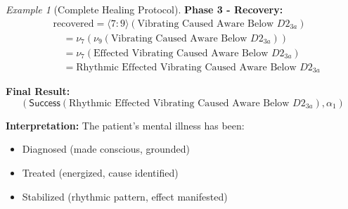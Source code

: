 \documentclass[11pt,twoside,openright]{book}
\theoremstyle{definition}
\theoremstyle{plain}
\theoremstyle{remark}
\newtheorem{example}[definition]{Example}
\newcommand{\noe}[1]{\nu_{#1}}
\begin{document}
\begin{example}[Complete Healing Protocol]
\textbf{Phase 3 - Recovery:}
\begin{align}
&\text{recovered} = \langle 7:9 \rangle(\text{Vibrating Caused Aware Below } D2_{3a}) \\
&\quad = \noe{7}(\noe{9}(\text{Vibrating Caused Aware Below } D2_{3a})) \\
&\quad = \noe{7}(\text{Effected Vibrating Caused Aware Below } D2_{3a}) \\
&\quad = \text{Rhythmic Effected Vibrating Caused Aware Below } D2_{3a}
\end{align}

\textbf{Final Result:}
\[
(\mathsf{Success}(\text{Rhythmic Effected Vibrating Caused Aware Below } D2_{3a}), \alpha_1)
\]

\textbf{Interpretation:} The patient's mental illness has been:
\begin{itemize}
  \item Diagnosed (made conscious, grounded)
  \item Treated (energized, cause identified)
  \item Stabilized (rhythmic pattern, effect manifested)
\end{itemize}
\end{example}
\end{document}

